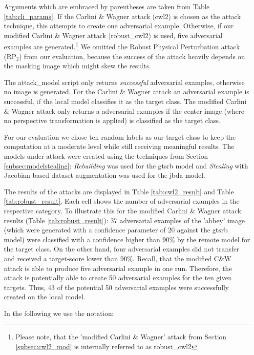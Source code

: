Arguments which are embraced by parentheses are taken from Table \ref{tab:cli_params}. If the Carlini \& Wagner attack (cwl2) is chosen as the attack technique, this attempts to create one adversarial example. Otherwise, if our modified Carlini \& Wagner attack (robust\_cwl2) is used, five adversarial examples are generated.\footnote{Please note, that the 'modified Carlini \& Wagner' attack from Section \ref{subsec:cwl2_mod} is internally referred to as robust\_cwl2} We omitted the Robust Physical Perturbation attack (RP$_2$) from our evaluation, because the success of the attack heavily depends on the masking image which might skew the results.

The attack\_model script only returns \emph{successful} adversarial examples, otherwise no image is generated. For the Carlini \& Wagner attack an adversarial example is successful, if the local model classifies it as the target class. The modified Carlini \& Wagner attack only returns a adversarial examples if the center image (where no perspective transformation is applied) is classified as the target class.

For our evaluation we chose ten random labels as our target class to keep the computation at a moderate level while still receiving meaningful results. The models under attack were created using the techniques from Section \ref{subsec:modelstealing}: \emph{Rebuilding} was used for the gtsrb model and \emph{Stealing} with Jacobian based dataset augmentation was used for the jbda model. 

The results of the attacks are displayed in Table \ref{tab:cwl2_result} and Table \ref{tab:robust_result}. Each cell shows the number of adversarial examples in the respective category. To illustrate this for the modified Carlini \& Wagner attack results (Table \ref{tab:robust_result}): 37 adversarial examples of the 'abbey' image (which were generated with a confidence parameter of 20 against the gtsrb model) were classified with a confidence higher than 90\% by the remote model for the target class. On the other hand, four adversarial examples did not transfer and received a target-score lower than 90\%. Recall, that the modified C\&W attack is able to produce five adversarial example in one run. Therefore, the attack is potentially able to create 50 adversarial examples for the ten given targets. Thus, 43 of the potential 50 adversarial examples were successfully created on the local model.

In the following we use the notation:

